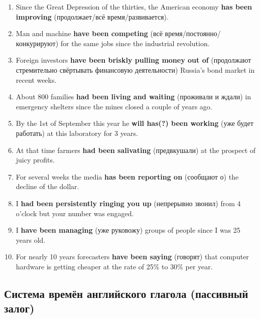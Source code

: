 \documentclass[main.tex]{subfiles}
\begin{document}

\begin{enumerate}[nosep,leftmargin=*]
	\item Since the Great Depression of the thirties, the American economy \textbf{has been improving} (продолжает/всё время/развивается).
	\item Man and machine \textbf{have been competing} (всё время/постоянно/конкурируют) for the same jobs since the industrial revolution.
	\item Foreign investors \textbf{have been briskly pulling money out of} (продолжают стремительно свёртывать финансовую деятельности) Russia's bond market in recent weeks.
	\item About 800 families \textbf{had been living and waiting} (проживали и ждали) in emergency shelters since the mines closed a couple of years ago.
	\item By the 1st of September this year he \textbf{will has(?) been working} (уже будет работать) at this laboratory for 3 years.
	\item At that time farmers \textbf{had been salivating} (предвкушали) at the prospect of juicy profits.
	\item For several weeks the media \textbf{has been reporting on} (сообщают о) the decline of the dollar.
	\item I \textbf{had been persistently ringing you up} (непрерывно звонил) from 4 o'clock but your number was engaged.
	\item I \textbf{have been managing} (уже руковожу) groups of people since I was 25 years old.
	\item For nearly 10 years forecasters \textbf{have been saying} (говорят) that computer hardware is getting cheaper at the rate of 25\% to 30\% per year.
\end{enumerate}

\subsection{Система времён английского глагола (пассивный залог)}

\end{document}

